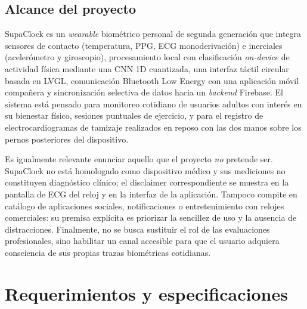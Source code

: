 \documentclass[letterpaper,11pt]{article}
\newcommand{\NombreProyecto}{SupaClock}
\begin{document}
\subsection{Alcance del proyecto}

SupaClock es un \textit{wearable} biom\'etrico personal de segunda generaci\'on que integra sensores de contacto (temperatura, PPG, ECG monoderivaci\'on) e inerciales (aceler\'ometro y giroscopio), procesamiento local con clasificaci\'on \textit{on-device} de actividad f\'isica mediante una CNN 1D cuantizada, una interfaz t\'actil circular basada en LVGL, comunicaci\'on Bluetooth Low Energy con una aplicaci\'on m\'ovil compa\~nera y sincronizaci\'on selectiva de datos hacia un \textit{backend} Firebase. El sistema est\'a pensado para monitoreo cotidiano de usuarios adultos con inter\'es en su bienestar f\'isico, sesiones puntuales de ejercicio, y para el registro de electrocardiogramas de tamizaje realizados en reposo con las dos manos sobre los pernos posteriores del dispositivo.

Es igualmente relevante enunciar aquello que el proyecto \emph{no} pretende ser. SupaClock no est\'a homologado como dispositivo m\'edico y sus mediciones no constituyen diagn\'ostico cl\'inico; el disclaimer correspondiente se muestra en la pantalla de ECG del reloj y en la interfaz de la aplicaci\'on. Tampoco compite en cat\'alogo de aplicaciones sociales, notificaciones o entretenimiento con relojes comerciales: su premisa expl\'icita es priorizar la sencillez de uso y la ausencia de distracciones. Finalmente, no se busca sustituir el rol de las evaluaciones profesionales, sino habilitar un canal accesible para que el usuario adquiera consciencia de sus propias trazas biom\'etricas cotidianas.



\newpage

\section{Requerimientos y especificaciones}\label{sec:requisitos}
\end{document}
